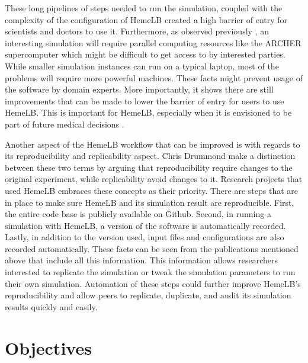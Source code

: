 These long pipelines of steps needed to run the simulation, coupled with the complexity of the configuration of HemeLB created a high barrier of entry for scientists and doctors to use it. Furthermore, as observed previously \citep{Steven:2016aa}, an interesting simulation will require parallel computing resources like the ARCHER supercomputer which might be difficult to get access to by interested parties. While smaller simulation instances can run on a typical laptop, most of the problems will require more powerful machines. These facts might prevent usage of the software by domain experts. More importantly, it shows there are still improvements that can be made to lower the barrier of entry for users to use HemeLB. This is important for HemeLB, especially when it is envisioned to be part of future medical decisions \citep{1_green_2014}.

Another aspect of the HemeLB workflow that can be improved is with regards to its reproducibility and replicability aspect. Chris Drummond \citep{drummond2009replicability} make a distinction between these two terms by arguing that reproducibility require changes to the original experiment, while replicability avoid changes to it. Research projects that used HemeLB embraces these concepts as their priority. There are steps that are in place to make sure HemeLB and its simulation result are reproducible. First, the entire code base is publicly available on Github. Second, in running a simulation with HemeLB, a version of the software is automatically recorded. Lastly, in addition to the version used, input files and configurations are also recorded automatically. These facts can be seen from the publications mentioned above \citep{bernabeu2015characterization,itani2015automated,franco2015dynamic,franco2016non} that include all this information. This information allows researchers interested to replicate the simulation or tweak the simulation parameters to run their own simulation. Automation of these steps could further improve HemeLB's reproducibility and allow peers to replicate, duplicate, and audit its simulation results quickly and easily. 


\section{Objectives}

